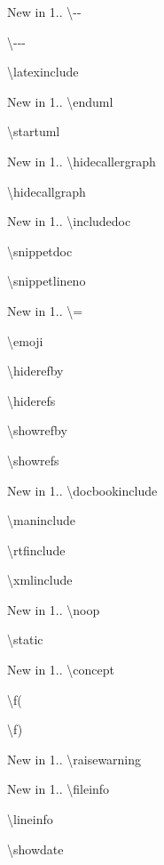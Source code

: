 \begin{DoxyDescription}
\item[New in 1.\+8.\+7]\textbackslash{}-\/-\/ 
\item[]\textbackslash{}-\/-\/-\/ 
\item[]\textbackslash{}latexinclude 
\item[New in 1.\+8.\+8]\textbackslash{}enduml 
\item[]\textbackslash{}startuml 
\item[New in 1.\+8.\+10]\textbackslash{}hidecallergraph 
\item[]\textbackslash{}hidecallgraph 
\item[New in 1.\+8.\+12]\textbackslash{}includedoc 
\item[]\textbackslash{}snippetdoc 
\item[]\textbackslash{}snippetlineno 
\item[New in 1.\+8.\+15]\textbackslash{}= 
\item[]\textbackslash{}emoji 
\item[]\textbackslash{}hiderefby 
\item[]\textbackslash{}hiderefs 
\item[]\textbackslash{}showrefby 
\item[]\textbackslash{}showrefs 
\item[New in 1.\+8.\+18]\textbackslash{}docbookinclude 
\item[]\textbackslash{}maninclude 
\item[]\textbackslash{}rtfinclude 
\item[]\textbackslash{}xmlinclude 
\item[New in 1.\+9.\+0]\textbackslash{}noop 
\item[]\textbackslash{}static 
\item[New in 1.\+9.\+2]\textbackslash{}concept 
\item[]\textbackslash{}f( 
\item[]\textbackslash{}f) 
\item[New in 1.\+9.\+3]\textbackslash{}raisewarning 
\item[New in 1.\+9.\+5]\textbackslash{}fileinfo 
\item[]\textbackslash{}lineinfo 
\item[]\textbackslash{}showdate 
\end{DoxyDescription}